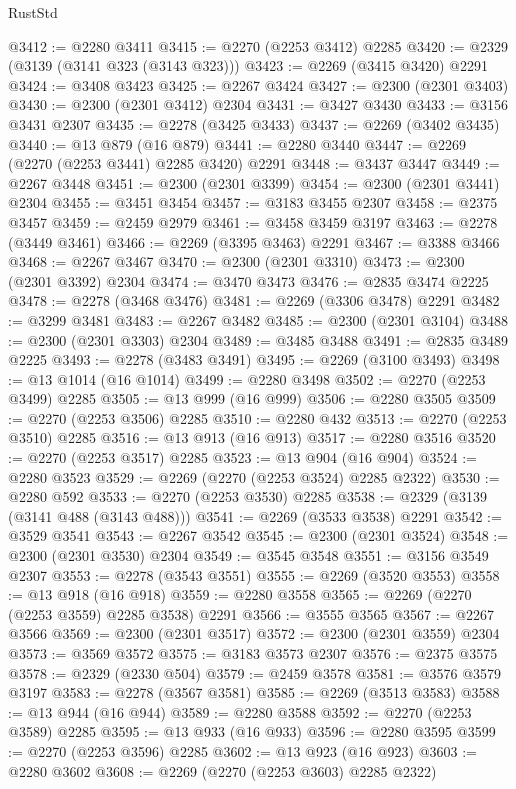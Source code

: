 \begin{lexlean}{RustStd}
\begin{coremodule}
{\begin{coremodule}
{{{{{{{{{{{{@3412 := @2280 @3411
@3415 := @2270 (@2253 @3412) @2285
@3420 := @2329 (@3139 (@3141 @323 (@3143 @323)))
@3423 := @2269 (@3415 @3420) @2291
@3424 := @3408 @3423
@3425 := @2267 @3424
@3427 := @2300 (@2301 @3403)
@3430 := @2300 (@2301 @3412) @2304
@3431 := @3427 @3430
@3433 := @3156 @3431 @2307
@3435 := @2278 (@3425 @3433)
@3437 := @2269 (@3402 @3435)
@3440 := @13 @879 (@16 @879)
@3441 := @2280 @3440
@3447 := @2269 (@2270 (@2253 @3441) @2285 @3420) @2291
@3448 := @3437 @3447
@3449 := @2267 @3448
@3451 := @2300 (@2301 @3399)
@3454 := @2300 (@2301 @3441) @2304
@3455 := @3451 @3454
@3457 := @3183 @3455 @2307
@3458 := @2375 @3457
@3459 := @2459 @2979
@3461 := @3458 @3459 @3197
@3463 := @2278 (@3449 @3461)
@3466 := @2269 (@3395 @3463) @2291
@3467 := @3388 @3466
@3468 := @2267 @3467
@3470 := @2300 (@2301 @3310)
@3473 := @2300 (@2301 @3392) @2304
@3474 := @3470 @3473
@3476 := @2835 @3474 @2225
@3478 := @2278 (@3468 @3476)
@3481 := @2269 (@3306 @3478) @2291
@3482 := @3299 @3481
@3483 := @2267 @3482
@3485 := @2300 (@2301 @3104)
@3488 := @2300 (@2301 @3303) @2304
@3489 := @3485 @3488
@3491 := @2835 @3489 @2225
@3493 := @2278 (@3483 @3491)
@3495 := @2269 (@3100 @3493)
@3498 := @13 @1014 (@16 @1014)
@3499 := @2280 @3498
@3502 := @2270 (@2253 @3499) @2285
@3505 := @13 @999 (@16 @999)
@3506 := @2280 @3505
@3509 := @2270 (@2253 @3506) @2285
@3510 := @2280 @432
@3513 := @2270 (@2253 @3510) @2285
@3516 := @13 @913 (@16 @913)
@3517 := @2280 @3516
@3520 := @2270 (@2253 @3517) @2285
@3523 := @13 @904 (@16 @904)
@3524 := @2280 @3523
@3529 := @2269 (@2270 (@2253 @3524) @2285 @2322)
@3530 := @2280 @592
@3533 := @2270 (@2253 @3530) @2285
@3538 := @2329 (@3139 (@3141 @488 (@3143 @488)))
@3541 := @2269 (@3533 @3538) @2291
@3542 := @3529 @3541
@3543 := @2267 @3542
@3545 := @2300 (@2301 @3524)
@3548 := @2300 (@2301 @3530) @2304
@3549 := @3545 @3548
@3551 := @3156 @3549 @2307
@3553 := @2278 (@3543 @3551)
@3555 := @2269 (@3520 @3553)
@3558 := @13 @918 (@16 @918)
@3559 := @2280 @3558
@3565 := @2269 (@2270 (@2253 @3559) @2285 @3538) @2291
@3566 := @3555 @3565
@3567 := @2267 @3566
@3569 := @2300 (@2301 @3517)
@3572 := @2300 (@2301 @3559) @2304
@3573 := @3569 @3572
@3575 := @3183 @3573 @2307
@3576 := @2375 @3575
@3578 := @2329 (@2330 @504)
@3579 := @2459 @3578
@3581 := @3576 @3579 @3197
@3583 := @2278 (@3567 @3581)
@3585 := @2269 (@3513 @3583)
@3588 := @13 @944 (@16 @944)
@3589 := @2280 @3588
@3592 := @2270 (@2253 @3589) @2285
@3595 := @13 @933 (@16 @933)
@3596 := @2280 @3595
@3599 := @2270 (@2253 @3596) @2285
@3602 := @13 @923 (@16 @923)
@3603 := @2280 @3602
@3608 := @2269 (@2270 (@2253 @3603) @2285 @2322)
}}}}}}}}}}}}
\end{coremodule}}
\end{coremodule}
\end{lexlean}
